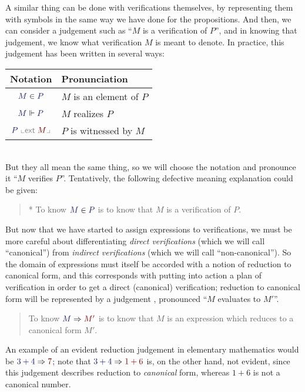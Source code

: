 \documentclass[main.tex]{subfiles}
\begin{document}
A similar thing can be done with verifications themselves, by
representing them with symbols in the same way we have done for the
propositions. And then, we can consider a judgement such as ``$M$ is a
verification of $P$'', and in knowing that judgement, we know what
verification $M$ is meant to denote. In practice, this judgement has
been written in several ways:\\[10pt]
\begin{tabular}{c|l}
  Notation & Pronunciation \\ \hline
  $\InputMode{M}\in \InputMode{P}$ & $M$ is an element of $P$\\
  $\InputMode{M}\Vdash \InputMode{P}$ & $M$ realizes $P$\\
  $\InputMode{P}\ {\color{Gray}\llcorner\mathsf{ext}\;} \OutputMode{M}{\color{Gray}\lrcorner}$ & $P$ is witnessed by $M$
\end{tabular}\\

But they all mean the same thing, so we will choose the notation
 and pronounce it ``$M$ verifies $P$''. Tentatively, the
following defective meaning explanation could be given:
\begin{quote}
  * To know $\ver{M}{P}$ is to know that $M$ is a verification of $P$.
\end{quote}

But now that we have started to assign expressions to verifications,
we must be more careful about differentiating \emph{direct
verifications} (which we will call ``canonical'') from \emph{indirect
verifications} (which we will call ``non-canonical''). So the domain
of expressions must itself be accorded with a notion of reduction to
canonical form, and this corresponds with putting into action a plan
of verification in order to get a direct (canonical) verification;
reduction to canonical form will be represented by a judgement
, pronounced ``$M$ evaluates to $M'$''.

\begin{quote}
  To know $\reduce{M}{M'}$ is to know that $M$ is an expression which reduces to
  a canonical form $M'$.
\end{quote}

An example of an evident reduction judgement in elementary mathematics
would be $\reduce{3+4}{7}$; note that $\reduce{3+4}{1+6}$ is, on the
other hand, not evident, since this judgement describes reduction to
\emph{canonical} form, whereas $1+6$ is not a canonical number.
\end{document}
